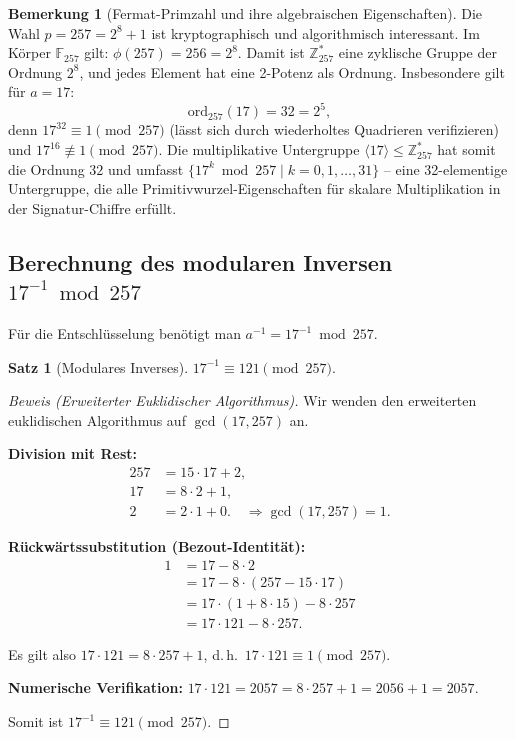 ﻿\documentclass[a4paper,12pt]{scrreprt}
\theoremstyle{definition}
\newtheorem{bemerkung}{Bemerkung}[section]
\newtheorem{satz}{Satz}[section]
\begin{document}
\begin{bemerkung}[Fermat-Primzahl und ihre algebraischen Eigenschaften]
Die Wahl $p = 257 = 2^8 + 1$ ist kryptographisch und algorithmisch interessant. Im Körper $\mathbb{F}_{257}$ gilt: $\phi(257) = 256 = 2^8$. Damit ist $\mathbb{Z}_{257}^*$ eine zyklische Gruppe der Ordnung $2^8$, und jedes Element hat eine 2-Potenz als Ordnung. Insbesondere gilt für $a = 17$:
\[
\mathrm{ord}_{257}(17) = 32 = 2^5,
\]
denn $17^{32} \equiv 1 \pmod{257}$ (lässt sich durch wiederholtes Quadrieren verifizieren) und $17^{16} \not\equiv 1 \pmod{257}$. Die multiplikative Untergruppe $\langle 17 \rangle \leq \mathbb{Z}_{257}^*$ hat somit die Ordnung $32$ und umfasst $\{17^k \bmod 257 \mid k = 0, 1, \ldots, 31\}$ -- eine 32-elementige Untergruppe, die alle Primitivwurzel-Eigenschaften für skalare Multiplikation in der Signatur-Chiffre erfüllt.
\end{bemerkung}

\subsection{Berechnung des modularen Inversen $17^{-1} \bmod 257$}

Für die Entschlüsselung benötigt man $a^{-1} = 17^{-1} \bmod 257$.

\begin{satz}[Modulares Inverses]
\label{satz:modinv17}
$17^{-1} \equiv 121 \pmod{257}$.
\end{satz}

\begin{proof}[Beweis (Erweiterter Euklidischer Algorithmus)]
Wir wenden den erweiterten euklidischen Algorithmus auf $\gcd(17, 257)$ an.

\textbf{Division mit Rest:}
\begin{align*}
257 &= 15 \cdot 17 + 2, \\
17  &= 8 \cdot 2 + 1, \\
2   &= 2 \cdot 1 + 0. \quad \Rightarrow \gcd(17, 257) = 1.
\end{align*}

\textbf{Rückwärtssubstitution (Bezout-Identität):}
\begin{align*}
1 &= 17 - 8 \cdot 2 \\
  &= 17 - 8 \cdot (257 - 15 \cdot 17) \\
  &= 17 \cdot (1 + 8 \cdot 15) - 8 \cdot 257 \\
  &= 17 \cdot 121 - 8 \cdot 257.
\end{align*}

Es gilt also $17 \cdot 121 = 8 \cdot 257 + 1$, d.\,h.\ $17 \cdot 121 \equiv 1 \pmod{257}$.

\textbf{Numerische Verifikation:}
$17 \cdot 121 = 2057 = 8 \cdot 257 + 1 = 2056 + 1 = 2057$. \checkmark

Somit ist $17^{-1} \equiv 121 \pmod{257}$.
\end{proof}
\end{document}
